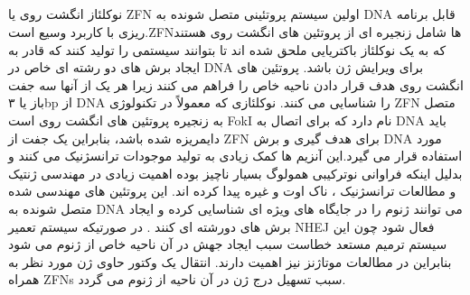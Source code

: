 \documentclass[12pt,a4paper,BCOR=.7cm,headsepline,bibliography=totoc]{report}
\begin{document}
\subsection{}

نوکلئاز انگشت روی یا ZFN اولین سیستم پروتئینی متصل شونده به DNA قابل برنامه ریزی با کاربرد وسیع است.ZFNها شامل زنجیره ای از پروتئین های انگشت روی هستند که به یک نوکلئاز باکتریایی ملحق شده اند تا بتوانند سیستمی را تولید کنند که قادر به ایجاد برش های دو رشته ای خاص در DNA برای ویرایش ژن باشد. پروتئین های انگشت روی هدف قرار دادن ناحیه خاص را فراهم می کنند زیرا هر یک از آنها سه جفت باز یا ۳bp از DNA را شناسایی می کنند. نوکلئازی که معمولاً در تکنولوژی ZFN متصل به زنجیره پروتئین های انگشت روی است FokI نام دارد که برای اتصال به DNA باید دایمریزه شده باشد، بنابراین یک جفت از ZFN برای هدف گیری و برش DNA مورد استفاده قرار می گیرد.این آنزیم ها کمک زیادی به تولید موجودات ترانسژنیک می کنند و بدلیل اینکه فراوانی نوترکیبی همولوگ بسیار ناچیز بوده اهمیت زیادی در مهندسی ژنتیک و مطالعات ترانسژنیک ، ناک اوت و غیره پیدا کرده اند. این پروتئین های مهندسی شده متصل شونده به DNA می توانند ژنوم را در جایگاه های ویژه ای شناسایی کرده و ایجاد برش های دورشته ای کنند . در صورتیکه سیستم تعمير NHEJ فعال شود چون این سیستم ترمیم مستعد خطاست سبب ایجاد جهش در آن ناحیه خاص از ژنوم می شود بنابراین در مطالعات موتاژنز نیز اهمیت دارند. انتقال یک وکتور حاوی ژن مورد نظر به همراه ZFNs سبب تسهیل درج ژن در آن ناحیه از ژنوم می گردد.
\end{document}
